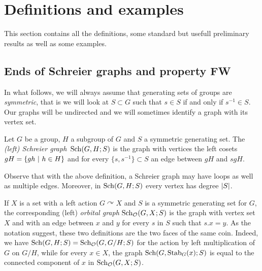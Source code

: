 %
%
%
%
%
%
%
%
%
%
\section{Definitions and examples}


This section contains all the definitions, some standard but usefull preliminary results as well as some examples.
%
%
%
%
%
%
%
%
%
%
\subsection{Ends of Schreier graphs and property FW}
\label{Subsection:FW}
%
%
%
%
%
In what follows, we will always assume that generating sets of groups are \emph{symmetric}, that is we will look at $S\subset G$ such that $s\in S$ if and only if $s^{-1}\in S$.
Our graphs will be undirected and we will sometimes identify a graph with its vertex set.
%
%
\begin{defn}
Let $G$ be a group, $H$ a subgroup of $G$ and $S$ a symmetric generating set. The \emph{(left) Schreier graph} $\operatorname{Sch}(G,H;S)$ is the graph with vertices the left cosets $gH=\{gh\ |\ h\in H\}$ and for every $\{s,s^{-1}\}\subset S$ an edge between $gH$ and $sgH$.%
\end{defn}
%
%
Observe that with the above definition, a Schreier graph may have loops as well as multiple edges. Moreover, in $\operatorname{Sch}(G,H;S)$ every vertex has degree $\lvert S\rvert$.

If $X$ is a set with a left action $G\curvearrowright X$ and $S$ is a symmetric generating set for $G$, the corresponding (left) \emph{orbital graph} $\operatorname{Sch}_{\mathcal O}(G,X;S)$ is the graph with vertex set $X$ and with an edge between $x$ and $y$ for every $s$ in $S$ such that $s.x=y$.
As the notation suggest, these two definitions are the two faces of the same coin. Indeed, we have $\operatorname{Sch}(G,H;S)=\operatorname{Sch}_{\mathcal O}(G,G/H;S)$ for the  action by left multiplication of $G$ on $G/H$, while   for every $x\in X$, the graph $\operatorname{Sch}(G,\operatorname{Stab}_G(x);S)$ is equal to the connected component of $x$ in $\operatorname{Sch}_{\mathcal O}(G,X;S)$.

